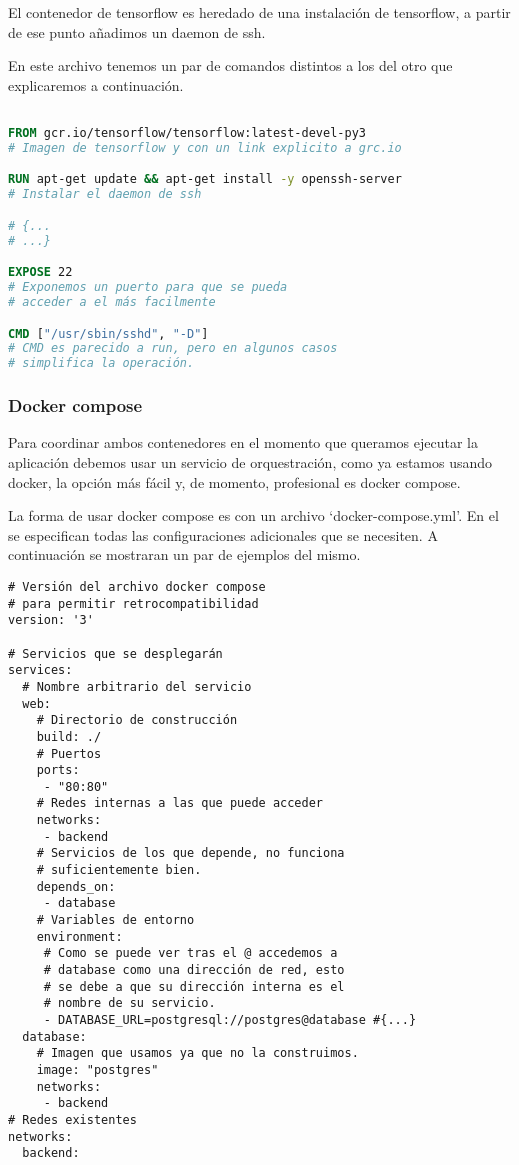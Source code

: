 El contenedor de tensorflow es heredado de una instalación de tensorflow, a partir de ese punto añadimos un daemon de ssh.

En este archivo tenemos un par de comandos distintos a los del otro que explicaremos a continuación.


\begin{lstlisting}[language=dockerfile]

FROM gcr.io/tensorflow/tensorflow:latest-devel-py3
# Imagen de tensorflow y con un link explicito a grc.io

RUN apt-get update && apt-get install -y openssh-server
# Instalar el daemon de ssh

# {...
# ...}

EXPOSE 22
# Exponemos un puerto para que se pueda 
# acceder a el más facilmente

CMD ["/usr/sbin/sshd", "-D"]
# CMD es parecido a run, pero en algunos casos 
# simplifica la operación.

\end{lstlisting}


\subsubsection{Docker compose}

Para coordinar ambos contenedores en el momento que queramos ejecutar la aplicación debemos usar un servicio de orquestración, como ya estamos usando docker, la opción más fácil y, de momento, profesional es docker compose.

La forma de usar docker compose es con un archivo `docker-compose.yml'. En el se especifican todas las configuraciones adicionales que se necesiten. A continuación se mostraran un par de ejemplos del mismo.

\begin{lstlisting}[language=dockercompose]
# Versión del archivo docker compose 
# para permitir retrocompatibilidad
version: '3'

# Servicios que se desplegarán 
services:
  # Nombre arbitrario del servicio  
  web:
    # Directorio de construcción
    build: ./
    # Puertos
    ports:
     - "80:80"
    # Redes internas a las que puede acceder
    networks:
     - backend
    # Servicios de los que depende, no funciona
    # suficientemente bien.
    depends_on:
     - database
    # Variables de entorno
    environment:
     # Como se puede ver tras el @ accedemos a 
     # database como una dirección de red, esto
     # se debe a que su dirección interna es el 
     # nombre de su servicio.
     - DATABASE_URL=postgresql://postgres@database #{...}
  database:
    # Imagen que usamos ya que no la construimos.
    image: "postgres"
    networks:
     - backend
# Redes existentes
networks:
  backend:
\end{lstlisting}


